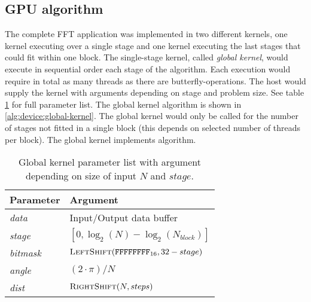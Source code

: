 \subsection{GPU algorithm}

The complete FFT application was implemented in two different kernels, one kernel executing over a single stage and one kernel executing the last stages that could fit within one block. The single-stage kernel, called \textit{global kernel}, would execute in sequential order each stage of the algorithm. Each execution would require in total as many threads as there are butterfly-operations. The host would supply the kernel with arguments depending on stage and problem size. See table \ref{tab:global-kernel} for full parameter list. The global kernel algorithm is shown in \ref{alg:device:global-kernel}. The global kernel would only be called for the number of stages not fitted in a single block (this depends on selected number of threads per block). The global kernel implements {\CTALG} algorithm.

\begin{table}
	\centering
	\begin{tabular}{|l|l|}
		\hline
		Parameter & Argument \\ \hline
		\textit{data} & Input/Output data buffer \\ \hline
		\textit{stage} & $[0,\log_{2}(N) - \log_{2}(N_{block})]$ \\ \hline
		\textit{bitmask} & $\Call{LeftShift}{\texttt{FFFFFFFF}_{16}, 32 - stage}$ \\ \hline
		\textit{angle} & $(2 \cdot \pi)/N$ \\ \hline
		\textit{dist} & $\Call{RightShift}{N, steps}$ \\ \hline		
	\end{tabular}
	\caption{Global kernel parameter list with argument depending on size of input $N$ and $stage$.}
	\label{tab:global-kernel}
\end{table}

